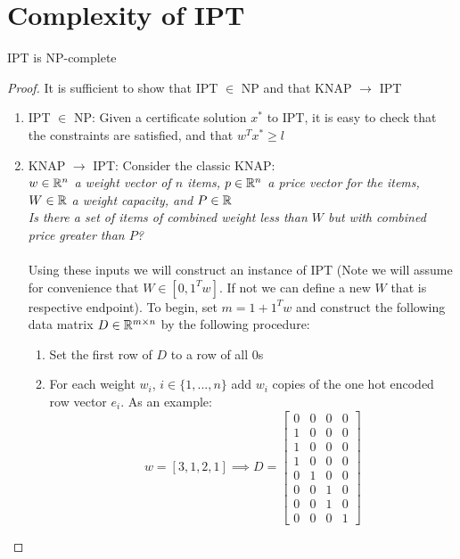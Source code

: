 \documentclass[12pt]{article}
\newcommand{\priv}{\text{IPT}}
\begin{document}
\section{Complexity of \gls{IPT}}
\begin{theorem}
    \gls{IPT} is NP-complete
\end{theorem}
\begin{proof}
    It is sufficient to show that \gls{IPT} $\in $ NP and that \gls{KNAP} $ \longrightarrow$  \gls{IPT}
    \begin{enumerate}
        \item \gls{IPT} $\in $ NP: Given a certificate solution $x^*$ to $\priv$, it is easy to check that the constraints are satisfied, and that $w^T x^* \geq l$
        \item \gls{KNAP} $ \longrightarrow$  \gls{IPT}: Consider the classic \gls{KNAP}:
        \\ 
        \textit{$w \in \mathbb{R}^n$ a weight vector of $n$ items, $p \in \mathbb{R}^n$ a price vector for the items, $W\in \mathbb{R}$ a weight capacity, and $P \in \mathbb{R}$}
        \\ 
        \textit{Is there a set of items of combined weight less than $W$ but with combined price greater than $P$?}
        \\~\\ 
        Using these inputs we will construct an instance of \gls{IPT} (Note we will assume for convenience that $W \in [0,1^Tw]$. If not we can define a new $W$ that is respective endpoint). To begin, set $m = 1+ 1^Tw$ and construct the following data matrix $D \in \mathbb{R}^{m\times n}$ by the following procedure:
        \begin{enumerate}
            \item Set the first row of $D$ to a row of all $0$s
            \item For each weight $w_i$, $i\in\{1,...,n\}$ add $w_i$ copies of the one hot encoded row vector $e_i$. As an example:
            \[w = [3,1,2,1] \implies D = \begin{bmatrix}
                0&0&0&0 \\
                1&0&0&0 \\
                1&0&0&0 \\
                1&0&0&0 \\
                0&1&0&0 \\
                0&0&1&0 \\
                0&0&1&0 \\
                0&0&0&1 

\end{bmatrix}\]
\end{enumerate}
\end{enumerate}
\end{proof}
\end{document}

